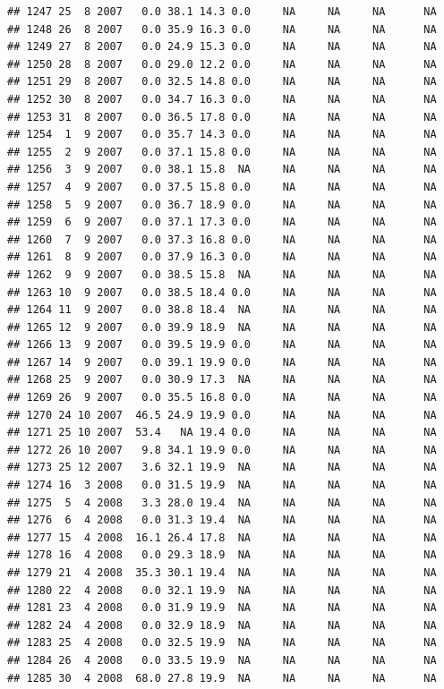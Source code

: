 \documentclass[
]{book}
\begin{document}
\begin{verbatim}
## 1247 25  8 2007   0.0 38.1 14.3 0.0     NA     NA     NA      NA
## 1248 26  8 2007   0.0 35.9 16.3 0.0     NA     NA     NA      NA
## 1249 27  8 2007   0.0 24.9 15.3 0.0     NA     NA     NA      NA
## 1250 28  8 2007   0.0 29.0 12.2 0.0     NA     NA     NA      NA
## 1251 29  8 2007   0.0 32.5 14.8 0.0     NA     NA     NA      NA
## 1252 30  8 2007   0.0 34.7 16.3 0.0     NA     NA     NA      NA
## 1253 31  8 2007   0.0 36.5 17.8 0.0     NA     NA     NA      NA
## 1254  1  9 2007   0.0 35.7 14.3 0.0     NA     NA     NA      NA
## 1255  2  9 2007   0.0 37.1 15.8 0.0     NA     NA     NA      NA
## 1256  3  9 2007   0.0 38.1 15.8  NA     NA     NA     NA      NA
## 1257  4  9 2007   0.0 37.5 15.8 0.0     NA     NA     NA      NA
## 1258  5  9 2007   0.0 36.7 18.9 0.0     NA     NA     NA      NA
## 1259  6  9 2007   0.0 37.1 17.3 0.0     NA     NA     NA      NA
## 1260  7  9 2007   0.0 37.3 16.8 0.0     NA     NA     NA      NA
## 1261  8  9 2007   0.0 37.9 16.3 0.0     NA     NA     NA      NA
## 1262  9  9 2007   0.0 38.5 15.8  NA     NA     NA     NA      NA
## 1263 10  9 2007   0.0 38.5 18.4 0.0     NA     NA     NA      NA
## 1264 11  9 2007   0.0 38.8 18.4  NA     NA     NA     NA      NA
## 1265 12  9 2007   0.0 39.9 18.9  NA     NA     NA     NA      NA
## 1266 13  9 2007   0.0 39.5 19.9 0.0     NA     NA     NA      NA
## 1267 14  9 2007   0.0 39.1 19.9 0.0     NA     NA     NA      NA
## 1268 25  9 2007   0.0 30.9 17.3  NA     NA     NA     NA      NA
## 1269 26  9 2007   0.0 35.5 16.8 0.0     NA     NA     NA      NA
## 1270 24 10 2007  46.5 24.9 19.9 0.0     NA     NA     NA      NA
## 1271 25 10 2007  53.4   NA 19.4 0.0     NA     NA     NA      NA
## 1272 26 10 2007   9.8 34.1 19.9 0.0     NA     NA     NA      NA
## 1273 25 12 2007   3.6 32.1 19.9  NA     NA     NA     NA      NA
## 1274 16  3 2008   0.0 31.5 19.9  NA     NA     NA     NA      NA
## 1275  5  4 2008   3.3 28.0 19.4  NA     NA     NA     NA      NA
## 1276  6  4 2008   0.0 31.3 19.4  NA     NA     NA     NA      NA
## 1277 15  4 2008  16.1 26.4 17.8  NA     NA     NA     NA      NA
## 1278 16  4 2008   0.0 29.3 18.9  NA     NA     NA     NA      NA
## 1279 21  4 2008  35.3 30.1 19.4  NA     NA     NA     NA      NA
## 1280 22  4 2008   0.0 32.1 19.9  NA     NA     NA     NA      NA
## 1281 23  4 2008   0.0 31.9 19.9  NA     NA     NA     NA      NA
## 1282 24  4 2008   0.0 32.9 18.9  NA     NA     NA     NA      NA
## 1283 25  4 2008   0.0 32.5 19.9  NA     NA     NA     NA      NA
## 1284 26  4 2008   0.0 33.5 19.9  NA     NA     NA     NA      NA
## 1285 30  4 2008  68.0 27.8 19.9  NA     NA     NA     NA      NA

\end{verbatim}
\end{document}

